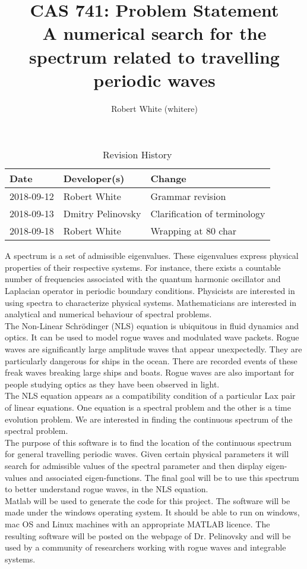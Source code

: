 \documentclass{article}
\title{CAS 741: Problem Statement\\A numerical search for the spectrum related
to travelling periodic waves}
\author{Robert White (whitere)}
\date{}
\begin{document}
\maketitle
\begin{table}[hp]
\caption{Revision History} \label{TblRevisionHistory}
\begin{tabularx}{\textwidth}{llX}
\toprule
\textbf{Date} & \textbf{Developer(s)} & \textbf{Change}\\
\midrule
2018-09-12 & Robert White & Grammar revision \\
2018-09-13 & Dmitry Pelinovsky & Clarification of terminology\\ 
2018-09-18 & Robert White & Wrapping at 80 char \\ 
\bottomrule
\end{tabularx}
\end{table}

A spectrum is a set of admissible eigenvalues. These eigenvalues express
physical properties of their respective systems. For instance, there exists a
countable number of frequencies associated with the quantum harmonic oscillator
and Laplacian operator in periodic boundary conditions. Physicists are
interested in using spectra to characterize physical systems. Mathematicians 
are interested in analytical and numerical behaviour of spectral problems.\\

The Non-Linear Schr\"{o}dinger (NLS) equation is ubiquitous in fluid dynamics 
and optics. It can be used to model rogue waves and modulated wave packets. 
Rogue waves are significantly large amplitude waves that appear unexpectedly. 
They are particularly dangerous for ships in the ocean. There are recorded 
events of these freak waves breaking large ships and boats. Rogue waves are 
also important for people studying optics as they have been observed in light. 
\\

The NLS equation appears as a compatibility condition of a particular Lax pair
of linear equations. One equation is a spectral problem and the other is a time
evolution problem. We are interested in finding the continuous spectrum of the
spectral problem. \\

The purpose of this software is to find the location of the continuous spectrum
for general travelling periodic waves. Given certain physical parameters it 
will search for admissible values of the spectral parameter and then display
eigen-values and associated eigen-functions. The final goal will be to use this
spectrum to better understand rogue waves, in the NLS equation.  \\ 

Matlab will be used to generate the code for this project. The software will be
made under the windows operating system. It should be able to run on windows,
mac OS and Linux machines with an appropriate MATLAB licence. The resulting
software will be posted on the webpage of Dr. Pelinovsky and will be used by a
community of researchers working with rogue waves and integrable systems. 


\end{document}
